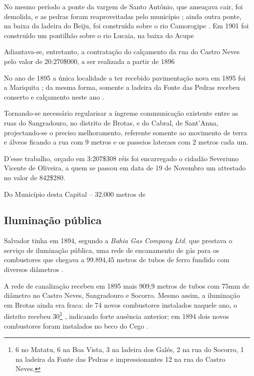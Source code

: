 No mesmo período a ponte da vargem de Santo Antônio, que ameaçava cair, foi demolida, e as pedras foram reaproveitadas pelo município \cite[p.~137]{salvador_relatorio_1896}; ainda outra ponte, na baixa da ladeira do Beiju, foi construída sobre o rio Camorogipe \cite[p.~156]{salvador_relatorio_1894}. Em 1901 foi construído um pontilhão sobre o rio Lucaia, na baixa do Acupe 

Adiantava-se, entretanto, a contratação do calçamento da rua do Castro Neves pelo valor de 20:270\$000, a ser realizada a partir de 1896 \cite[p.~23]{salvador_relatorio_1896}

No ano de 1895 a única localidade a ter recebido pavimentação nova em 1895 foi a Mariquita \cite[p.~16]{salvador_relatorio_1896}; da mesma forma, somente a ladeira da Fonte das Pedras recebeu conserto e calçamento neste ano \cite[p.~16]{salvador_relatorio_1896}. 



\begin{citacao}
Tornando-se necessário regularisar a íngreme communicação existente entre as ruas do Sangradouro, no distrito de Brotas, e do Cabral, de Sant'Anna, projectando-se o preciso melhoramento, referente somente ao movimento de terra e álveos ficando a rua com 9 metros e os passeios lateraes com 2 metros cada um.

D'esse trabalho, orçado em 3:207\$308 réis foi encarregado o cidadão Severiuno Vicente de Oliveira, a quem se passou em data de 19 de Novembro um attestado no valor de 842\$280.
\end{citacao}

\begin{citacao}
Do Município desta Capital -- 32.000 metros de 
\end{citacao}








\subsection{Iluminação pública}


Salvador tinha em 1894, segundo a \textit{Bahia Gas Company Ltd.} que prestava o serviço de iluminação pública, uma rede de encanamento de gás para os combustores que chegava a 99.894,45 metros de tubos de ferro fundido com diversos diâmetros \cite[p.~178]{salvador_relatorio_1894}.

A rede de canalização recebeu em 1895 mais 909,9 metros de tubos com 75mm de diâmetro no Castro Neves, Sangradouro e Socorro. Mesmo assim, a iluminação em Brotas ainda era fraca: de 74 novos combustores instalados naquele ano, o distrito recebeu 30\footnote{6 no Matatu, 6 na Boa Vista, 3 na ladeira dos Galés, 2 na rua do Socorro, 1 na ladeira da Fonte das Pedras e impressionantes 12 na rua do Castro Neves.} \cite[pp.~149-150]{salvador_relatorio_1896}, indicando forte ausência anterior; em 1894 dois novos combustores foram instalados no beco do Cego \cite[p.~179]{salvador_relatorio_1894}.

